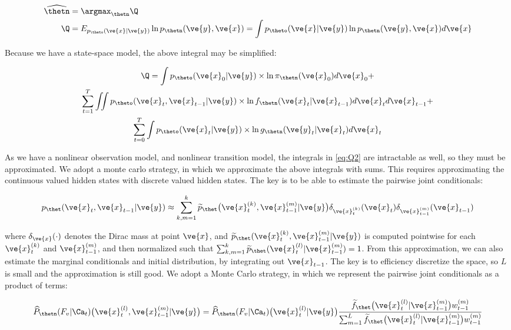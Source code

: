 \documentclass[12pt]{article}
\newcommand{\x}{\ve{x}}
\newcommand{\y}{\ve{y}}
\newcommand{\xT}{\x} %
\newcommand{\yT}{\y}
\newcommand{\fhat}{\widetilde{f}_{\thet} \big(\x_t^{(l)} | \x_{t-1}^{(m)}\big)}
\newcommand{\phat}{\widehat{P}_{\thetn}(F_v | \Ca_t)}
\begin{document}
\begin{align}
\widehat{\thetn} &= \argmax_{\thetn} \Q\\
\Q &= E_{p_{\theto}(\xT | \yT)} \ln p_{\thetn} (\yT, \xT)%
= \int p_{\theto} (\xT | \yT) \ln p_{\thetn} (\yT, \xT) d\xT 
\end{align}

Because we have a state-space model, the above integral may be simplified:

\begin{multline} \label{eq:Q2}
\Q = \int p_{\theto}(\x_0 | \yT)  \times \ln \pi_{\thetn}(\x_0) d\x_0 + \\
\sum_{t=1}^T \iint p_{\theto} (\x_t, \x_{t-1} | \yT) \times \ln f_{\thetn}(\x_t | \x_{t-1}) d\x_t d\x_{t-1} + \\
\sum_{t=0}^T \int p_{\theto} (\x_t | \yT) \times \ln g_{\thetn}(\y_t | \x_t) d\x_t
\end{multline}

As we have a nonlinear observation model, and nonlinear transition model, the integrals in \eqref{eq:Q2} are intractable as well, so they must be approximated. We adopt a monte carlo strategy, in which we approximate the above integrals with sums. This requires approximating the continuous valued hidden states with discrete valued hidden states. The key is to be able to estimate the pairwise joint conditionals:

\begin{align}
p_{\thet} (\x_t, \x_{t-1} | \yT) \approx \sum_{k,m=1}^k \widetilde{p}_{\thet} \big(\x_t^{(k)}, \x_{t-1}^{(m)} | \yT\big) \delta_{\x_t^{(k)}}(\x_t) \delta_{\x_{t-1}^{(m)}} (\x_{t-1})
\end{align}

\noindent where $\delta_{\x}(\cdot)$ denotes the Dirac mass at point $\x$, and $\widetilde{p}_{\thet}(\x_t^{(k)},  \x_{t-1}^{(m)} | \yT)$ is computed pointwise for each $\x_t^{(k)}$ and $\x_{t-1}^{(m)}$, and then normalized such that $\sum_{k,m=1}^k \widetilde{p}_{\thet}(\x_t^{(l)} | \x_{t-1}^{(m)})=1$. From this approximation, we can also estimate the marginal conditionals and initial distribution, by integrating out $\x_{t-1}$. The key is to efficiency discretize the space, so $L$ is small and the approximation is still good.  We adopt a Monte Carlo strategy, in which we represent the pairwise joint conditionals as a product of terms:

\begin{align}
 \phat \big(\x_t^{(l)}, \x_{t-1}^{(m)} | \yT\big) = \phat \big(\x_t^{(l)} | \yT\big) \frac{\fhat w_{t-1}^{(m)}} {\sum_{m=1}^L  \fhat w_{t-1}^{(m)}}
\end{align}
\end{document}
